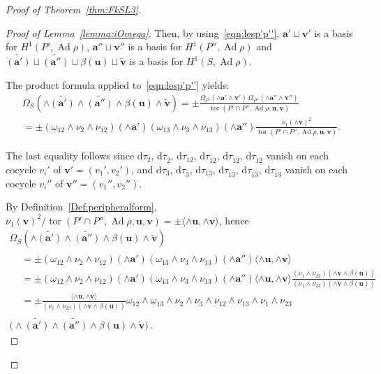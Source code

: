 \documentclass[11pt]{article}
\theoremstyle{definition}
\numberwithin{equation}{section}
\numberwithin{figure}{section}
\numberwithin{table}{section}
\DeclareMathOperator{\tor}{tor}
\DeclareMathOperator{\Ad}{Ad}
\newcommand{\ubf}{\mathbf{u}}
\newcommand{\vbf}{\mathbf{v}}
\newcommand{\abf}{\mathbf{a}}
\newcommand*{\dd}{\mathrm{d}}
\begin{document}
\begin{proof}[Proof of Theorem~\ref{thm:FkSL3}]
\begin{proof}[Proof of Lemma~\ref{lemma:iOmega}]
Then, by using~\eqref{eqn:lesp'p''}, $\abf'\sqcup \vbf'$ is a basis for $H^1(P',\Ad\rho)$, $\abf''\sqcup \vbf''$ is a basis for $H^1(P'',\Ad\rho)$ and $\widetilde{(\abf')}\sqcup \widetilde{(\abf'')}\sqcup \beta (\ubf)\sqcup \widetilde{\vbf}$ is a basis for $H^1(S,\Ad\rho)$.


The product formula applied to~\eqref{eqn:lesp'p''} yields:
\begin{multline*}
\Omega_S(\wedge\widetilde{(\abf')}\wedge \widetilde{(\abf'')}\wedge\beta(\ubf)\wedge \widetilde{\vbf})=\pm
\frac{\Omega_{P'} (\wedge\abf' \wedge\vbf')\, \Omega_{P''} (\wedge\abf'' \wedge\vbf'') }{\tor(P'\cap P'',\Ad\rho,\ubf,\vbf)}
\\
=\pm (\omega_{12}\wedge\nu_2\wedge\nu_{12}) (\wedge\abf') (\omega_{13}\wedge\nu_3\wedge\nu_{13}) (\wedge\abf'')
\frac{\nu_1(\wedge\vbf)^2}{\tor(P'\cap P'',\Ad\rho,\ubf,\vbf)}.
\end{multline*}



The last equality follows since $\dd\tau_2$, $\dd\tau_{\bar{2}}$, $\dd\tau_{12}$, $\dd\tau_{\bar1\bar2}$, $\dd\tau_{1\bar2}$, $\dd\tau_{\bar1 2}$ vanish on each cocycle $v_i'$ of $\vbf'= (v_1',v_2')$, and $\dd\tau_3$, $\dd\tau_{\bar{3}}$, $\dd\tau_{13}$, $\dd\tau_{\bar1\bar3}$, $\dd\tau_{1\bar3}$, $\dd\tau_{\bar1 3}$ vanish on each cocycle $v_i''$ of $\vbf''= (v_1'',v_2'')$.


By Definition~\ref{Def:peripheralform}, $ {\nu_1(\vbf)^2}/{ \tor(P'\cap P'',\Ad\rho,\ubf,\vbf) } =
\pm\langle \wedge\ubf, \wedge\vbf \rangle $, hence
\begin{multline*}
\Omega_S(\wedge\widetilde{(\abf')}\wedge \widetilde{(\abf'')}\wedge\beta(\ubf)\wedge \widetilde{\vbf})\\
\begin{aligned}
&=\pm (\omega_{12}\wedge\nu_2\wedge\nu_{12}) (\wedge\abf') (\omega_{13}\wedge\nu_3\wedge\nu_{13}) (\wedge\abf'') \langle \wedge\ubf, \wedge\vbf \rangle\\
&=\pm (\omega_{12}\wedge\nu_2\wedge\nu_{12}) (\wedge\abf') (\omega_{13}\wedge\nu_3\wedge\nu_{13}) (\wedge\abf'') \langle \wedge\ubf, \wedge\vbf \rangle
\frac {(\nu_1 \wedge \nu_{23}) (\wedge\vbf\wedge\beta(\ubf)) }{(\nu_1 \wedge \nu_{23}) (\wedge\vbf\wedge\beta(\ubf)) }\\
&=\pm\frac{\langle \wedge\ubf, \wedge\vbf \rangle}{ (\nu_1 \wedge \nu_{23}) (\wedge\vbf\wedge\beta(\ubf)) }\omega_{12}\wedge \omega_{13} \wedge\nu_2\wedge\nu_3\wedge\nu_{12}\wedge\nu_{13} \wedge \nu_1\wedge \nu_{23}
\end{aligned}
\\
\bigl(\wedge\widetilde{(\abf')}\wedge\widetilde{(\abf'')} \wedge\beta(\ubf)\wedge\widetilde{\vbf} \big)\,.
\end{multline*}



\end{proof}
\end{proof}
\end{document}
